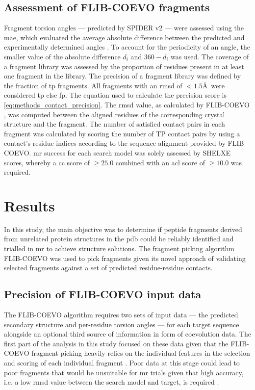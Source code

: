 \subsection{Assessment of FLIB-COEVO fragments}
Fragment torsion angles --- predicted by SPIDER v2 \cite{Heffernan2015-bt} --- were assessed using the \gls{mae}, which evaluated the average absolute difference between the predicted and experimentally determined angles \cite{Heffernan2015-bt}. To account for the periodicity of an angle, the smaller value of the absolute difference $d_i$ and $360-d_i$ was used. The coverage of a fragment library was assessed by the proportion of residues present in at least one fragment in the library. The precision of a fragment library was defined by the fraction of \gls{tp} fragments. All fragments with an \gls{rmsd} of $<1.5$\AA\ were considered \gls{tp} else \gls{fp}. The equation used to calculate the precision score is \cref{eq:methods_contact_precision}. The \gls{rmsd} value, as calculated by FLIB-COEVO \cite{De_Oliveira2018-za}, was computed between the aligned residues of the corresponding crystal structure and the fragment. The number of satisfied contact pairs in each fragment was calculated by scoring the number of TP contact pairs by using a contact's residue indices according to the sequence alignment provided by FLIB-COEVO. \Gls{mr} success for each search model was solely assessed by SHELXE scores, whereby a \gls{cc} score of $\geq25.0$ combined with an \gls{acl} score of $\geq10.0$ was required.

\section{Results}
In this study, the main objective was to determine if peptide fragments derived from unrelated protein structures in the \gls{pdb} could be reliably identified and trialled in \gls{mr} to achieve structure solutions. The fragment picking algorithm FLIB-COEVO \cite{De_Oliveira2018-za} was used to pick fragments given its novel approach of validating selected fragments against a set of predicted residue-residue contacts.

\subsection{Precision of FLIB-COEVO input data}
The FLIB-COEVO algorithm requires two sets of input data --- the predicted secondary structure and per-residue torsion angles --- for each target sequence alongside an optional third source of information in form of coevolution data. The first part of the analysis in this study focused on these data given that the FLIB-COEVO fragment picking heavily relies on the individual features in the selection and scoring of each individual fragment \cite{De_Oliveira2018-za}. Poor data at this stage could lead to poor fragments that would be unsuitable for \gls{mr} trials given that high accuracy, i.e. a low \gls{rmsd} value between the search model and target, is required \cite{Scapin2013-yp}.


